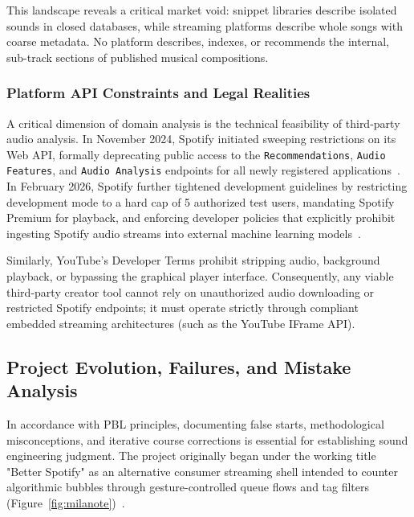 This landscape reveals a critical market void: snippet libraries describe isolated sounds in closed databases, while streaming platforms describe whole songs with coarse metadata. No platform describes, indexes, or recommends the internal, sub-track sections of published musical compositions.

\subsubsection*{Platform API Constraints and Legal Realities}
A critical dimension of domain analysis is the technical feasibility of third-party audio analysis. In November 2024, Spotify initiated sweeping restrictions on its Web API, formally deprecating public access to the \texttt{Recommendations}, \texttt{Audio Features}, and \texttt{Audio Analysis} endpoints for all newly registered applications~\cite{ref:spotifydev2024}. In February 2026, Spotify further tightened development guidelines by restricting development mode to a hard cap of 5 authorized test users, mandating Spotify Premium for playback, and enforcing developer policies that explicitly prohibit ingesting Spotify audio streams into external machine learning models~\cite{ref:spotifydev2026, ref:spotify_policy2025}. 

Similarly, YouTube's Developer Terms prohibit stripping audio, background playback, or bypassing the graphical player interface. Consequently, any viable third-party creator tool cannot rely on unauthorized audio downloading or restricted Spotify endpoints; it must operate strictly through compliant embedded streaming architectures (such as the YouTube IFrame API).

\subsection*{Project Evolution, Failures, and Mistake Analysis}

In accordance with PBL principles, documenting false starts, methodological misconceptions, and iterative course corrections is essential for establishing sound engineering judgment. The project originally began under the working title "Better Spotify" as an alternative consumer streaming shell intended to counter algorithmic bubbles through gesture-controlled queue flows and tag filters (Figure~\ref{fig:milanote})~\cite{ref:torres_beer2025}.

